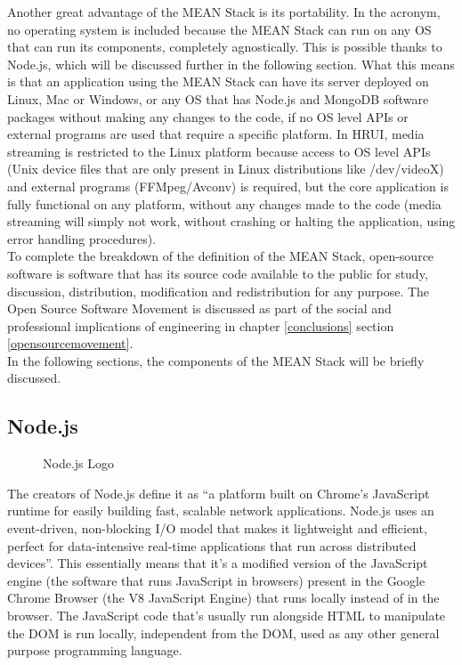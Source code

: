 Another great advantage of the MEAN Stack is its portability. In the acronym, no operating system is included because the MEAN
Stack can run on any OS that can run its components, completely agnostically. This is possible thanks to Node.js, which will
be discussed further in the following section. What this means is that an application using the MEAN Stack can have its
server deployed on Linux, Mac or Windows, or any OS that has Node.js and MongoDB software packages without making any changes
to the code, if no OS level APIs or external programs are used that require a specific platform. In HRUI, media streaming is
restricted to the Linux platform because access to OS level APIs (Unix device files that are only present in Linux
distributions like /dev/videoX) and external programs (FFMpeg/Avconv) is required, but the core application is fully
functional on any platform, without any changes made to the code (media streaming will simply not work, without crashing or
halting the application, using error handling procedures).\\

To complete the breakdown of the definition of the MEAN Stack, open-source software is software that has its source code available to the public for study, discussion, distribution, modification and redistribution for any purpose. The Open Source Software Movement is discussed as part of the social and professional implications of engineering in chapter \ref{conclusions} section \ref{opensourcemovement}.\\

In the following sections, the components of the MEAN Stack will be briefly discussed.\\

\subsection{Node.js}
\begin{figure}[H]
\centering

\caption{Node.js Logo}
\end{figure}
The creators of Node.js define it as ``a platform built on Chrome's JavaScript runtime for easily building fast, scalable network applications. Node.js uses an event-driven, non-blocking I/O model that makes it lightweight and efficient, perfect for data-intensive real-time applications that run across distributed devices''\cite{nodejs15}. This essentially means that it's a modified version of the JavaScript engine (the software that runs JavaScript in browsers) present in the Google Chrome Browser (the V8 JavaScript Engine) that runs locally instead of in the browser. The JavaScript code that's usually run alongside HTML to manipulate the DOM is run locally, independent from the DOM, used as any other general purpose programming language.\\

